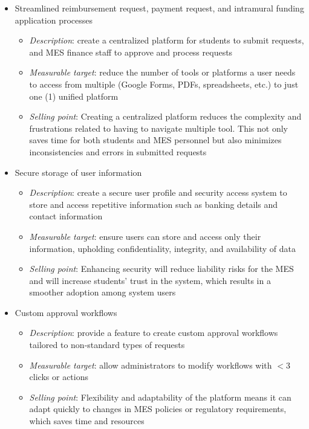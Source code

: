 \documentclass{article}
\begin{document}
\begin{itemize}
    \item Streamlined reimbursement request, payment request, and intramural funding application processes
    \begin{itemize}
        \item \emph{Description}: create a centralized platform for students to submit requests, and MES finance staff to approve and process requests
        \item \emph{Measurable target}: reduce the number of tools or platforms a user needs to access from multiple (Google Forms, PDFs, spreadsheets, etc.) to just one (1) unified platform
        \item \emph{Selling point}: Creating a centralized platform reduces the complexity and frustrations related to having to navigate multiple tool. This not only saves time for both students and MES personnel but also minimizes inconsistencies and errors in submitted requests
    \end{itemize}
    \item Secure storage of user information
    \begin{itemize}
        \item \emph{Description}: create a secure user profile and security access system to store and access repetitive information such as banking details and contact information
        \item \emph{Measurable target}: ensure users can store and access only their information, upholding confidentiality, integrity, and availability of data
        \item \emph{Selling point}: Enhancing security will reduce liability risks for the MES and will increase students' trust in the system, which results in a smoother adoption among system users
    \end{itemize}
    \item Custom approval workflows
    \begin{itemize}
        \item \emph{Description}: provide a feature to create custom approval workflows tailored to non-standard types of requests
        \item \emph{Measurable target}: allow administrators to modify workflows with $<$3 clicks or actions
        \item \emph{Selling point}: Flexibility and adaptability of the platform means it can adapt quickly to changes in MES policies or regulatory requirements, which saves time and resources

\end{itemize}
\end{itemize}
\end{document}
